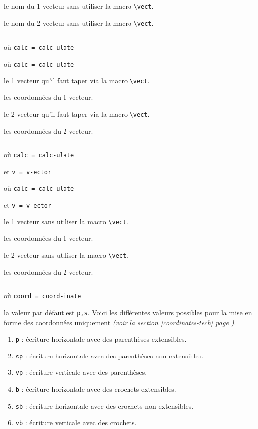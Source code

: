 \documentclass[12pt,a4paper]{article}
\newcommand\env[1]{\texttt{#1}}
\newcommand\macro[1]{\env{\textbackslash{}#1}}
\theoremstyle{definition}
\newcommand\separation{
	\medskip
	\hfill\rule{0.5\textwidth}{0.75pt}\hfill
	\medskip
}
\newcommand\mwhyprefix[2]{%
	\texttt{#1 = #1-#2}%
}
\begin{document}
 le nom du 1\ier{} vecteur sans utiliser la macro \macro{vect}.

 le nom du 2\ieme{} vecteur sans utiliser la macro \macro{vect}.


\separation


  où \quad \mwhyprefix{calc}{ulate}

  où \quad \mwhyprefix{calc}{ulate}

 le 1\ier{} vecteur qu'il faut taper via la macro \macro{vect}.

 les coordonnées du 1\ier{} vecteur.

 le 2\ieme{} vecteur qu'il faut taper via la macro \macro{vect}.

 les coordonnées du 2\ieme{} vecteur.


\separation


  où \quad \mwhyprefix{calc}{ulate}
                                    et \mwhyprefix{v}{ector}

  où \quad \mwhyprefix{calc}{ulate}
                                    et \mwhyprefix{v}{ector}

 le 1\ier{} vecteur sans utiliser la macro \macro{vect}.

 les coordonnées du 1\ier{} vecteur.

 le 2\ieme{} vecteur sans utiliser la macro \macro{vect}.

 les coordonnées du 2\ieme{} vecteur.


\separation


  où \quad \mwhyprefix{coord}{inate}

\IDoption{} la valeur par défaut est \verb+p,s+. 
            Voici les différentes valeurs possibles pour la mise en forme des coordonnées uniquement \emph{(voir la section \ref{coordinates-tech} page \pageref{coordinates-tech})}.
\begin{enumerate}
	\item \verb+p+ : écriture horizontale avec des parenthèses extensibles.

	\item \verb+sp+ : écriture horizontale avec des parenthèses non extensibles.

	\item \verb+vp+ : écriture verticale avec des parenthèses.

	\item \verb+b+ : écriture horizontale avec des crochets extensibles.

	\item \verb+sb+ : écriture horizontale avec des crochets non extensibles.

	\item \verb+vb+ : écriture verticale avec des crochets.
\end{enumerate}
\end{document}
